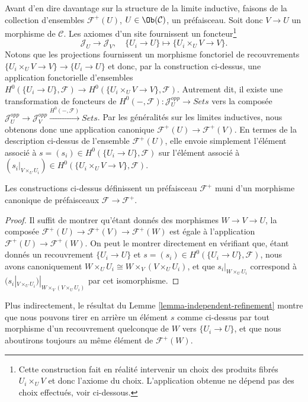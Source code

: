 \medskip\noindent
Avant d’en dire davantage sur la structure de la limite inductive, faisons
de la collection d’ensembles
$\mathcal{F}^{+}(U)$, $U \in \Ob(\mathcal{C})$,
un préfaisceau. Soit donc $V \to U$ un morphisme de $\mathcal{C}$.
Les axiomes d’un site fournissent un foncteur\footnote{Cette construction
fait en réalité intervenir un choix des produits fibrés $U_i \times_U V$
et donc l’axiome du choix. L’application obtenue ne dépend pas
des choix effectués, voir ci-dessous.}
$$
\mathcal{J}_U
\longrightarrow
\mathcal{J}_V, \quad
\{U_i \to U\}
\longmapsto
\{U_i \times_U V \to V\}.
$$
Notons que les projections fournissent un
morphisme fonctoriel de recouvrements $\{U_i \times_U V \to V\} \to \{U_i \to U\}$
et donc, par la construction ci-dessus, une application fonctorielle d’ensembles
$H^0(\{U_i \to U\}, \mathcal{F}) \to
H^0(\{U_i \times_U V \to V\}, \mathcal{F})$.
Autrement dit, il existe une transformation de foncteurs
de $H^0(-, \mathcal{F}) : \mathcal{J}_U^{opp} \to \textit{Sets}$
vers la composée
$\mathcal{J}_U^{opp} \to \mathcal{J}_V^{opp}
\xrightarrow{H^0(-, \mathcal{F})} \textit{Sets}$. Par les
généralités sur les limites inductives, nous obtenons donc une application canonique
$\mathcal{F}^+(U) \to \mathcal{F}^+(V)$. En termes de la description
ci-dessus de l’ensemble $\mathcal{F}^+(U)$, elle envoie simplement l’élément
associé à $s = (s_i) \in H^0(\{U_i \to U\}, \mathcal{F})$ sur l’élément
associé à $(s_i|_{V \times_U U_i})
\in H^0(\{U_i \times_U V \to V\}, \mathcal{F})$.

\begin{lemma}
\label{lemma-plus-presheaf}
Les constructions ci-dessus définissent un préfaisceau
$\mathcal{F}^+$ muni d’un morphisme canonique
de préfaisceaux $\mathcal{F} \to \mathcal{F}^+$.
\end{lemma}

\begin{proof}
Il suffit de montrer qu’étant donnés des morphismes
$W \to V \to U$, la composée $\mathcal{F}^+(U)
\to \mathcal{F}^+(V) \to \mathcal{F}^+(W)$
est égale à l’application $\mathcal{F}^+(U) \to \mathcal{F}^+(W)$.
On peut le montrer directement en vérifiant que, étant donnés
un recouvrement $\{U_i \to U\}$ et
$s = (s_i) \in H^0(\{U_i \to U\}, \mathcal{F})$,
nous avons canoniquement
$W \times_U U_i \cong W \times_V (V \times_U U_i)$,
et que
$s_i|_{W \times_U U_i}$
correspond à
$(s_i|_{V \times_U U_i})|_{W \times_V (V \times_U U_i)}$
par cet isomorphisme.
\end{proof}

\noindent
Plus indirectement, le résultat du
Lemme \ref{lemma-independent-refinement} montre que
nous pouvons tirer en arrière un élément $s$ comme ci-dessus par tout morphisme
d’un recouvrement quelconque de $W$ vers $\{U_i \to U\}$,
et que nous aboutirons toujours au même élément de
$\mathcal{F}^+(W)$.

